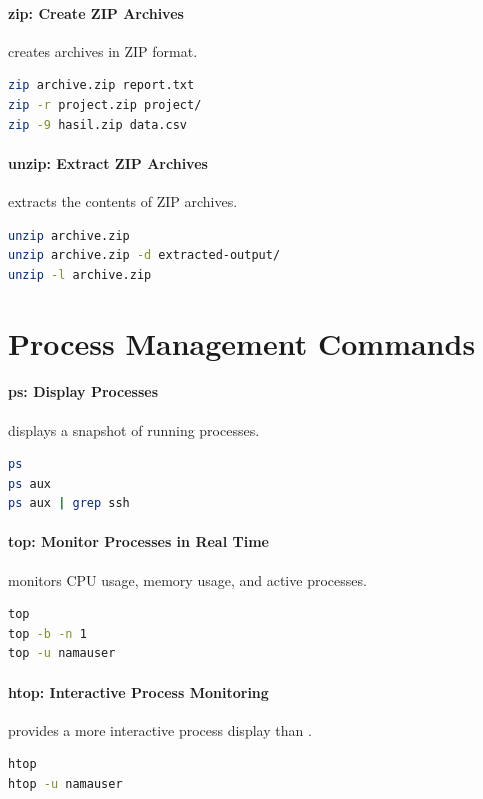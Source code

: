 \paragraph*{zip: Create ZIP Archives}
 creates archives in ZIP format.
\begin{lstlisting}[language=bash]
zip archive.zip report.txt
zip -r project.zip project/
zip -9 hasil.zip data.csv
\end{lstlisting}

\paragraph*{unzip: Extract ZIP Archives}
 extracts the contents of ZIP archives.
\begin{lstlisting}[language=bash]
unzip archive.zip
unzip archive.zip -d extracted-output/
unzip -l archive.zip
\end{lstlisting}

\section{Process Management Commands}

\paragraph*{ps: Display Processes}
 displays a snapshot of running processes.
\begin{lstlisting}[language=bash]
ps
ps aux
ps aux | grep ssh
\end{lstlisting}

\paragraph*{top: Monitor Processes in Real Time}
 monitors CPU usage, memory usage, and active processes.
\begin{lstlisting}[language=bash]
top
top -b -n 1
top -u namauser
\end{lstlisting}

\paragraph*{htop: Interactive Process Monitoring}
 provides a more interactive process display than .
\begin{lstlisting}[language=bash]
htop
htop -u namauser
\end{lstlisting}

